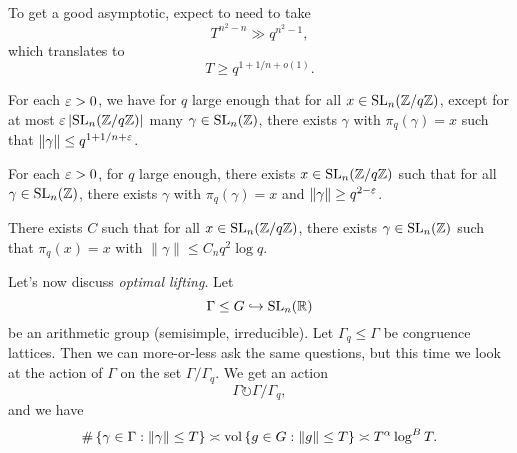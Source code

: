 \documentclass[reqno]{amsart} 
\begin{document}
To get a good asymptotic, expect to need to take
\begin{equation*}
T^{n^2 - n} \gg q^{n^2 - 1},
\end{equation*}
which translates to
\begin{equation*}
T \geq q^{1  + 1 / n + o(1)}.
\end{equation*}

\begin{theorem}\label{theorem:cj4460l2nz}
  For each $\varepsilon > 0$, we have for $q$ large enough that for all $x \in \operatorname{SL}_n (\mathbb{Z} / q \mathbb{Z} )$, except for at most $\varepsilon \left\lvert \operatorname{SL}_n (\mathbb{Z} / q \mathbb{Z} ) \right\rvert$ many $\gamma \in \operatorname{SL}_n (\mathbb{Z})$, there exists $\gamma$ with $\pi_q (\gamma ) = x$ such that $\lVert \gamma  \rVert \leq q^{1 + 1/n + \varepsilon}$.
\end{theorem}

\begin{theorem}[K--Varju]\label{theorem:cj4460l3qs}
  For each $\varepsilon > 0$, for $q$ large enough, there exists $x \in \operatorname{SL}_n (\mathbb{Z} / q \mathbb{Z} )$ such that for all $\gamma \in \operatorname{SL}_n (\mathbb{Z} )$, there exists $\gamma $ with $\pi_q (\gamma ) = x$ and $\lVert \gamma \rVert \geq q^{2 - \varepsilon }$.
\end{theorem}

\begin{theorem}
There exists $C$ such that for all $x \in \operatorname{SL}_n (\mathbb{Z} / q \mathbb{Z})$, there exists $\gamma \in \operatorname{SL}_n (\mathbb{Z})$ such that $\pi_q (x) = x$ with $\lVert \gamma  \rVert \leq C_n q^2 \log q$.
\end{theorem}

Let's now discuss \emph{optimal lifting}.  Let
\begin{equation*}
\Gamma \leq G \hookrightarrow \operatorname{SL}_n (\mathbb{R})
\end{equation*}
be an arithmetic group (semisimple, irreducible).  Let $\Gamma_q \leq \Gamma $ be congruence lattices.  Then we can more-or-less ask the same questions, but this time we look at the action of $\Gamma$ on the set $\Gamma / \Gamma_q$.  We get an action
\begin{equation*}
\Gamma \circlearrowright \Gamma / \Gamma_q,
\end{equation*}
and we have
\begin{equation*}
  \# \left\{ \gamma \in \Gamma : \lVert \gamma  \rVert \leq T \right\}
  \asymp \operatorname{vol} \left\{ g \in G : \lVert g \rVert \leq T \right\}
  \asymp
  T^\alpha \log^B T.
\end{equation*}
\end{document}
